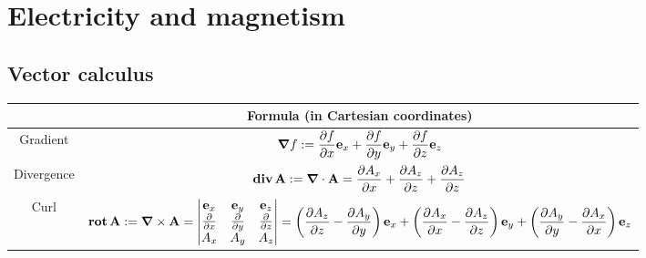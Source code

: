 \documentclass[../../../main.tex]{subfiles}
\begin{document}
\section{Electricity and magnetism}
\subsection{Vector calculus}
\begin{center}
  \begin{tabular}{|c|c|}

    \hline
               & Formula (in Cartesian coordinates)                                                                                                                                                                                                                                                                                                                                                                 \\
    \hline
    Gradient   & $\displaystyle\grad f:=\frac{\partial f}{\partial x}\boldsymbol{\mathrm{e}}_x+\frac{\partial f}{\partial y}\boldsymbol{\mathrm{e}}_y+\frac{\partial f}{\partial z}\boldsymbol{\mathrm{e}}_z$                                                                                                                                                                                                                      \\
    \hline
    Divergence & $\displaystyle\operatorname{\boldsymbol{\mathrm{div}}} \boldsymbol{\mathrm{A}}:=\grad\cdot\boldsymbol{\mathrm{A}}=\frac{\partial A_x}{\partial x}+\frac{\partial A_z}{\partial z}+\frac{\partial A_z}{\partial z}$                                                                                                                                                                                                                               \\
    \hline
    Curl       & $\displaystyle\operatorname{\boldsymbol{\mathrm{rot}}} \boldsymbol{\mathrm{A}}:=\grad\times\boldsymbol{\mathrm{A}}=\begin{vmatrix}
        \boldsymbol{\mathrm{e}}_x        & \boldsymbol{\mathrm{e}}_y        & \boldsymbol{\mathrm{e}}_z        \\
        \frac{\partial}{\partial x} & \frac{\partial}{\partial y} & \frac{\partial}{\partial z} \\
        A_x                         & A_y                         & A_z                         \\
      \end{vmatrix}=\left(\frac{\partial A_z}{\partial z}-\frac{\partial A_y}{\partial y}\right)\boldsymbol{\mathrm{e}}_x+\left(\frac{\partial A_x}{\partial x}-\frac{\partial A_z}{\partial z}\right)\boldsymbol{\mathrm{e}}_y+\left(\frac{\partial A_y}{\partial y}-\frac{\partial A_x}{\partial x}\right)\boldsymbol{\mathrm{e}}_z$ \\

\end{tabular}
\end{center}
\end{document}
